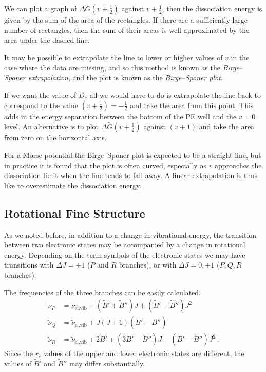 \documentclass{article}
\theoremstyle{plain}\theoremheaderfont{\normalfont\itshape}\theorembodyfont{\rmfamily}\theoremseparator{.}\newtheorem*{rem}{Remark}\newtheorem*{ex}{Example}\newtheorem*{proof}{Proof}\newtheorem*{altp}{Alternative proof}
\theoremstyle{plain}\theoremheaderfont{\normalfont\bfseries}\theorembodyfont{\rmfamily}\theoremseparator{.}\newtheorem{thm}{Theorem}[section]\newtheorem{lem}[thm]{Lemma}\newtheorem{prop}[thm]{Proposition}\newtheorem*{cor}{Corollary}\newtheorem{defn}[thm]{Definition}\newtheorem{clm}[thm]{Claim}\newtheorem{clminproof}{Claim}\newtheorem{pos}{Postulate}[section]
\theoremstyle{break}\theoremheaderfont{\normalfont\itshape}\theorembodyfont{\rmfamily}\theoremseparator{.\medskip}\newtheorem*{proofskip}{Proof}\newtheorem*{exs}{Examples}\newtheorem*{rems}{Remarks}
\theoremstyle{break}\theoremheaderfont{\normalfont\bfseries}\theorembodyfont{\rmfamily}\theoremseparator{.\medskip}\newtheorem{lemskip}[thm]{Lemma}\newtheorem{defnskip}[thm]{Definition}\newtheorem{propskip}[thm]{Proposition}\newtheorem{thmskip}[thm]{Theorem}
\numberwithin{equation}{section}
\begin{document}
    We can plot a graph of \(\Delta\tilde{G}(v+\frac{1}{2})\) against \(v+\frac{1}{2}\), then the dissociation energy is given by the sum of the area of the rectangles. If there are a sufficiently large number of rectangles, then the sum of their areas is well approximated by the area under the dashed line.

    It may be possible to extrapolate the line to lower or higher values of \(v\) in the case where the data are missing, and so this method is known as the \textit{Birge--Sponer extrapolation}, and the plot is known as the \textit{Birge--Sponer plot}.

    If we want the value of \(\tilde{D}_e\) all we would have to do is extrapolate the line back to correspond to the value \((v+\frac{1}{2})=-\frac{1}{2}\) and take the area from this point. This adds in the energy separation between the bottom of the PE well and the \(v=0\) level. An alternative is to plot \(\Delta\tilde{G}(v+\frac{1}{2})\) against \((v + 1)\) and take the area from zero on the horizontal axis.

    For a Morse potential the Birge--Sponer plot is expected to be a straight line, but in practice it is found that the plot is often curved, especially as \(v\) approaches the dissociation limit when the line tends to fall away. A linear extrapolation is thus like to overestimate the dissociation energy.

    \subsection{Rotational Fine Structure}
    As we noted before, in addition to a change in vibrational energy, the transition between two electronic states may be accompanied by a change in rotational energy. Depending on the term symbols of the electronic states we may have transitions with \(\Delta J=\pm 1\) (\(P\) and \(R\) branches), or with \(\Delta J=0,\pm 1\) (\(P,Q,R\) branches).
    
    The frequencies of the three branches can be easily calculated.
    \begin{align}
        \tilde{\nu}_P&=\tilde{\nu}_{\text{el,vib}}-(\tilde{B}'+\tilde{B}'')J+(\tilde{B}'-\tilde{B}'')J^2\\
        \tilde{\nu}_Q&=\tilde{\nu}_{\text{el,vib}}+J(J+1)(\tilde{B}'-\tilde{B}'')\\
        \tilde{\nu}_R&=\tilde{\nu}_{\text{el,vib}}+2\tilde{B}'+(3\tilde{B}'-\tilde{B}'')J+(\tilde{B}'-\tilde{B}'')J^2\,.
    \end{align}
    Since the \(r_e\) values of the upper and lower electronic states are different, the values of \(\tilde{B}'\) and \(\tilde{B}''\) may differ substantially.
\end{document}
